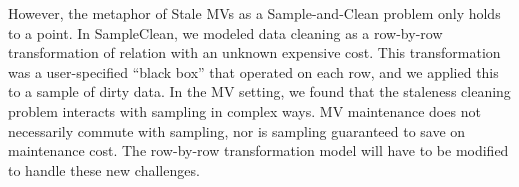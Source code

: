 However, the metaphor of Stale MVs as a Sample-and-Clean problem only holds to a point.
In SampleClean, we modeled data cleaning as a row-by-row transformation of relation with an unknown expensive cost. 
This transformation was a user-specified  ``black box'' that operated on each row, and we applied this to a sample of dirty data.
In the MV setting, we found that the staleness cleaning problem interacts with sampling in complex ways. 
MV maintenance does not necessarily commute with sampling, nor is sampling guaranteed to save on maintenance cost.
The row-by-row transformation model will have to be modified to handle these new challenges. 

